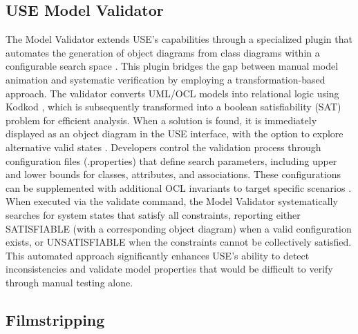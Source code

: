 \subsection{USE Model Validator}
The Model Validator extends USE's capabilities through a specialized plugin that 
automates the generation of object diagrams from class diagrams within a configurable 
search space \cite{USE}. This plugin bridges the gap between manual model animation 
and systematic verification by employing a transformation-based approach. The 
validator converts UML/OCL models into relational logic using Kodkod \cite{Kodkod}, which is 
subsequently transformed into a boolean satisfiability (SAT) problem for efficient 
analysis. When a solution is found, it is immediately displayed as an object diagram 
in the USE interface, with the option to explore alternative valid states \cite{Model_Validator_2}. Developers 
control the validation process through configuration files (.properties) that define 
search parameters, including upper and lower bounds for classes, attributes, and 
associations. These configurations can be supplemented with additional OCL invariants 
to target specific scenarios \cite{Properties_file}. When executed via the validate command, the Model 
Validator systematically searches for system states that satisfy all constraints, 
reporting either SATISFIABLE (with a corresponding object diagram) when a valid 
configuration exists, or UNSATISFIABLE when the constraints cannot be collectively 
satisfied. This automated approach significantly enhances USE's ability to detect 
inconsistencies and validate model properties that would be difficult to verify 
through manual testing alone.


\subsection{Filmstripping}
\label{subsec:filmstripping}
